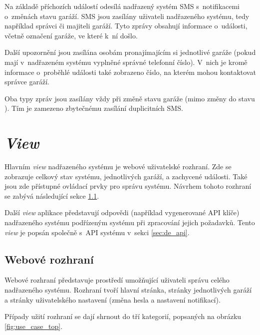 
Na základě příchozích událostí odesílá nadřazený systém SMS s~notifikacemi o~změnách stavu garáží. SMS jsou zasílány uživateli nadřazeného systému, tedy například správci či majiteli garáží. Tyto zprávy obsahují informace o~události, včetně označení garáže, ve které k~ní došlo. 

Další upozornění jsou zasílána osobám pronajímajícím si jednotlivé garáže (pokud mají v~nadřazeném systému vyplněné správné telefonní číslo). V~nich je kromě informace o~proběhlé události také zobrazeno číslo, na kterém mohou kontaktovat správce garáží.

Oba typy zpráv jsou zasílány vždy při změně stavu garáže (mimo změny do stavu ). Tím je zamezeno zbytečnému zasílání duplicitních SMS.

\section{\textit{View}}
\label{sec:de_view}

Hlavním \textit{view} nadřazeného systému je webové uživatelské rozhraní. Zde se zobrazuje celkový stav systému, jednotlivých garáží, a zachycené události. Také jsou zde přístupné ovládací prvky pro správu systému. Návrhem tohoto rozhraní se zabývá následující sekce \ref{sec:de_web}.

Další \textit{view} aplikace představují odpovědi (například vygenerované API klíče) nadřazeného systému podřízeným systému při zpracování jejich požadavků. Tento \textit{view} je popsán společně s~API systému v~sekci \ref{sec:de_api}.

\subsection{Webové rozhraní}
\label{sec:de_web}

Webové rozhraní představuje prostředí umožňující uživateli správu celého nadřazeného systému. Rozhraní tvoří hlavní stránka, stránky jednotlivých garáží a stránky uživatelského nastavení (změna hesla a nastavení notifikací).

Případy užití rozhraní se dají shrnout do tří kategorií, popsaných na obrázku \ref{fig:use_case_top}.

